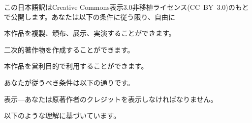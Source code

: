 \vspace{0.15cm}

\noindent
この日本語訳はCreative Commons表示3.0非移植ライセンス(CC~BY~3.0)のもとで公開します。あなたは以下の条件に従う限り、自由に

\begin{aosaitemize}
  \item 本作品を複製、頒布、展示、実演することができます。
  \item 二次的著作物を作成することができます。
  \item 本作品を営利目的で利用することができます。
\end{aosaitemize}

\noindent
あなたが従うべき条件は以下の通りです。

\begin{aosaitemize}
  \item 表示---あなたは原著作者のクレジットを表示しなければなりません。
\end{aosaitemize}

\noindent
以下のような理解に基づいています。

